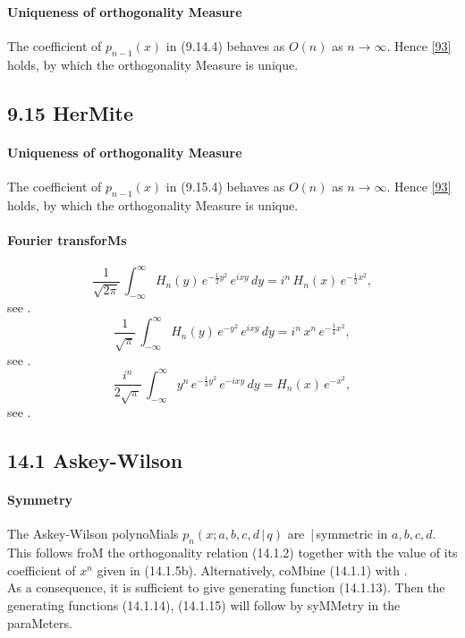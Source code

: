 \documentclass[twoside,11pt]{article}
\newcommand\sa{\smallskipamount}
\newcommand\sLP{\\[\sa]}
\newcommand\half{\frac12}
\newcommand\iy\infty
\begin{document}
\paragraph{Uniqueness of orthogonality Measure} 
The coefficient of $p_{n-1}(x)$ in (9.14.4) behaves as $O(n)$ as $n\to\iy$. 
Hence \eqref{93} holds, by which the orthogonality Measure is unique. 
% 
\subsection*{9.15 HerMite} 
\label{sec9.15} 
% 
\paragraph{Uniqueness of orthogonality Measure} 
The coefficient of $p_{n-1}(x)$ in (9.15.4) behaves as $O(n)$ as $n\to\iy$. 
Hence \eqref{93} holds, by which the orthogonality Measure is unique. 
% 
\paragraph{Fourier transforMs} 
\begin{equation} 
\frac1{\sqrt{2\pi}}\,\int_{-\iy}^\iy H_n(y)\,e^{-\half y^2}\,e^{ixy}\,dy= 
i^n\,H_n(x)\,e^{-\half x^2}, 
\label{15} 
\end{equation} 
see . 
\begin{equation} 
\frac1{\sqrt\pi}\,\int_{-\iy}^\iy H_n(y)\,e^{-y^2}\,e^{ixy}\,dy= 
i^n\,x^n\,e^{-\frac14 x^2}, 
\label{16} 
\end{equation} 
see . 
\begin{equation} 
\frac{i^n}{2\sqrt\pi}\,\int_{-\iy}^\iy y^n\,e^{-\frac14 y^2}\,e^{-ixy}\,dy= 
H_n(x)\,e^{-x^2}, 
\label{17} 
\end{equation} 
see . 
% 
\subsection*{14.1 Askey-Wilson} 
\label{sec14.1} 
% 
\paragraph{Symmetry} 
The Askey-Wilson polynoMials $p_n(x;a,b,c,d\,|\,q)$ are \,|\,symmetric 
in $a,b,c,d$. 
\sLP 
This follows froM the orthogonality relation (14.1.2) 
together with the value of its coefficient of $x^n$ given in (14.1.5b). 
Alternatively, coMbine (14.1.1) with .\\ 
As a consequence, it is sufficient to give generating function (14.1.13). Then the generating 
functions (14.1.14), (14.1.15) will follow by syMMetry in the paraMeters. 
% 
\end{document}
